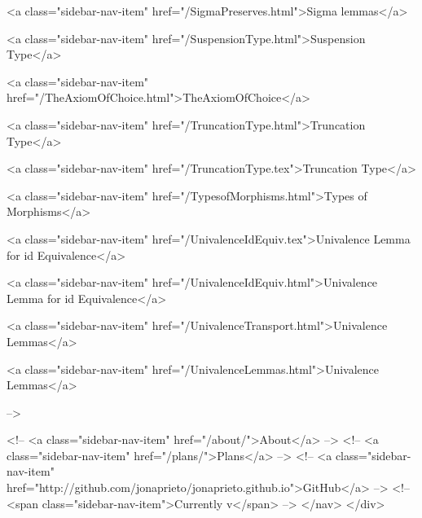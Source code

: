       
    
      
        
          <a class="sidebar-nav-item" href="/SigmaPreserves.html">Sigma lemmas</a>
        
      
    
      
        
          <a class="sidebar-nav-item" href="/SuspensionType.html">Suspension Type</a>
        
      
    
      
        
          <a class="sidebar-nav-item" href="/TheAxiomOfChoice.html">TheAxiomOfChoice</a>
        
      
    
      
        
          <a class="sidebar-nav-item" href="/TruncationType.html">Truncation Type</a>
        
      
    
      
        
          <a class="sidebar-nav-item" href="/TruncationType.tex">Truncation Type</a>
        
      
    
      
        
          <a class="sidebar-nav-item" href="/TypesofMorphisms.html">Types of Morphisms</a>
        
      
    
      
        
          <a class="sidebar-nav-item" href="/UnivalenceIdEquiv.tex">Univalence Lemma for id Equivalence</a>
        
      
    
      
        
          <a class="sidebar-nav-item" href="/UnivalenceIdEquiv.html">Univalence Lemma for id Equivalence</a>
        
      
    
      
        
          <a class="sidebar-nav-item" href="/UnivalenceTransport.html">Univalence Lemmas</a>
        
      
    
      
        
          <a class="sidebar-nav-item" href="/UnivalenceLemmas.html">Univalence Lemmas</a>
        
      
     -->

    <!-- <a class="sidebar-nav-item" href="/about/">About</a> -->
    <!-- <a class="sidebar-nav-item" href="/plans/">Plans</a> -->
    <!-- <a class="sidebar-nav-item" href="http://github.com/jonaprieto/jonaprieto.github.io">GitHub</a> -->
    <!-- <span class="sidebar-nav-item">Currently v</span> -->
  </nav>
</div>

